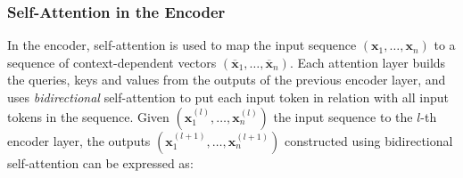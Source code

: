 



\subsubsection{Self-Attention in the Encoder} 

In the encoder, self-attention is used to map the input sequence $(\bm{x}_1, \ldots, \bm{x}_n)$ to a sequence of context-dependent vectors $(\overline{\bm{x}}_1, \ldots, \overline{\bm{x}}_n)$. Each attention layer builds the queries, keys and values from the outputs of the previous encoder layer, and uses \textit{bidirectional} self-attention to put each input token in relation with all input tokens in the sequence. Given $(\bm{x}^{(l)}_1, \ldots, \bm{x}^{(l)}_n)$ the input sequence to the $l$-th encoder layer, the outputs $(\bm{x}^{(l+1)}_1, \ldots, \bm{x}^{(l+1)}_n)$ constructed using bidirectional self-attention can be expressed as:


